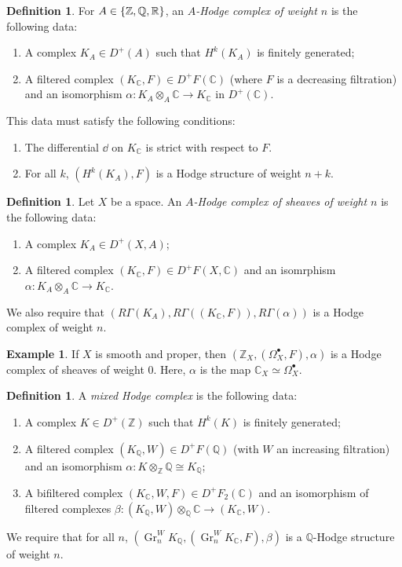 \documentclass[leqno, openany]{memoir}
\theoremstyle{definition}
\newtheorem{defn}[thm]{Definition}
\newtheorem{exm}[thm]{Example}
\theoremstyle{remark}
\theoremstyle{plain}
\theoremstyle{definition}
\theoremstyle{remark}
\newcommand{\R}{\mathbb{R}}
\newcommand{\C}{\mathbb{C}}
\newcommand{\Z}{\mathbb{Z}}
\newcommand{\Q}{\mathbb{Q}}
\newcommand{\on}[1]{\operatorname{#1}}
\begin{document}
\begin{defn}
    For $A \in \qty{\Z, \Q, \R}$, an \textit{$A$-Hodge complex of weight $n$} is the following data:
    \begin{enumerate}
        \item A complex $K_A \in D^+(A)$ such that $H^k(K_A)$ is finitely generated;
        \item A filtered complex $(K_{\C}, F) \in D^+ F(\C)$ (where $F$ is a decreasing filtration) and an isomorphism $\alpha \colon K_A \otimes_A \C \to K_{\C}$ in $D^+(\C)$.
    \end{enumerate}
    This data must satisfy the following conditions:
    \begin{enumerate}
        \item The differential $\dd$ on $K_{\C}$ is strict with respect to $F$.
        \item For all $k$, $(H^k(K_A), F)$ is a Hodge structure of weight $n+k$.
    \end{enumerate}
\end{defn}

\begin{defn}
    Let $X$ be a space. An \textit{$A$-Hodge complex of sheaves of weight $n$} is the following data:
    \begin{enumerate}
        \item A complex $K_A \in D^+(X, A)$;
        \item A filtered complex $(K_{\C}, F) \in D^+ F(X, \C)$ and an isomrphism $\alpha \colon K_A \otimes_A \C \to K_{\C}$.
    \end{enumerate}
    We also require that $(R \Gamma(K_A), R\Gamma((K_{\C}, F)), R\Gamma(\alpha))$ is a Hodge complex of weight $n$.
\end{defn}

\begin{exm}
    If $X$ is smooth and proper, then $(\Z_X, (\Omega_X^{\bullet}, F), \alpha)$ is a Hodge complex of sheaves of weight $0$. Here, $\alpha$ is the map $\C_X \simeq \Omega_X^{\bullet}$.
\end{exm}

\begin{defn}
    A \textit{mixed Hodge complex} is the following data:
    \begin{enumerate}
        \item A complex $K \in D^+(\Z)$ such that $H^k(K)$ is finitely generated;
        \item A filtered complex $(K_{\Q}, W) \in D^+ F(\Q)$ (with $W$ an increasing filtration) and an isomorphism $\alpha \colon K \otimes_{\Z} \Q \cong K_{\Q}$;
        \item A bifiltered complex $(K_{\C}, W, F) \in D^+ F_2(\C)$ and an isomorphism of filtered complexes $\beta \colon (K_{\Q}, W) \otimes_{\Q} \C \to (K_{\C}, W)$.
    \end{enumerate}
    We require that for all $n$, $(\on{Gr}_n^W K_{\Q}, (\on{Gr}_n^W K_{\C}, F), \beta)$ is a $\Q$-Hodge structure of weight $n$.
\end{defn}
\end{document}
